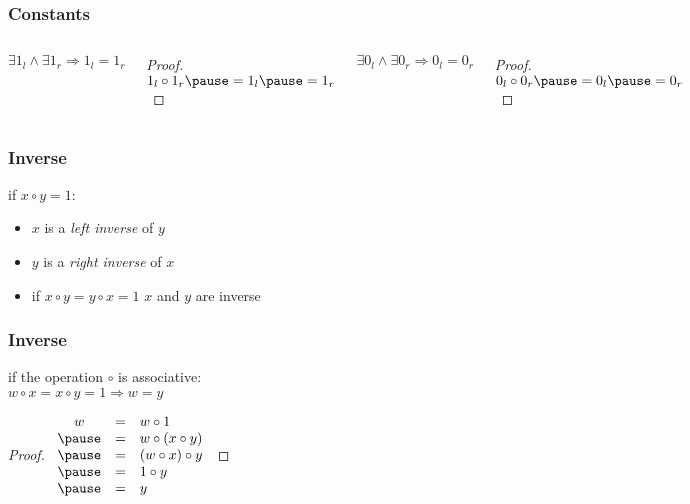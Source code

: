 \documentclass[dvipsnames]{beamer}
\begin{document}
\begin{frame}
  \frametitle{Constants}

  \begin{columns}
    \begin{theorem}
      $\exists 1_l \wedge \exists 1_r \Rightarrow 1_l = 1_r$
    \end{theorem}

    \pause
    \begin{proof}
      $1_l \circ 1_r \pause = 1_l \pause = 1_r$
    \end{proof}

    \pause
    \begin{theorem}
      $\exists 0_l \wedge \exists 0_r \Rightarrow 0_l = 0_r$
    \end{theorem}

    \pause
    \begin{proof}
      $0_l \circ 0_r \pause = 0_l \pause = 0_r$
    \end{proof}
  \end{columns}
\end{frame}

\begin{frame}
  \frametitle{Inverse}

  \begin{definition}
    if $x \circ y = 1$:

    \begin{itemize}
      \item $x$ is a \emph{left inverse} of $y$
      \item $y$ is a \emph{right inverse} of $x$

      \pause
      \medskip
      \item if $x \circ y = y \circ x = 1$
        $x$ and $y$ are \alert{inverse}
    \end{itemize}
  \end{definition}
\end{frame}

\begin{frame}
  \frametitle{Inverse}

  \begin{theorem}
    if the operation $\circ$ is associative:\\
    $w \circ x = x \circ y = 1 \Rightarrow w = y$
  \end{theorem}

  \pause
  \begin{proof}
    $\begin{array}{ccl}
      w & = & w \circ 1\\ \pause
        & = & w \circ (x \circ y)\\ \pause
        & = & (w \circ x) \circ y\\ \pause
        & = & 1 \circ y\\ \pause
        & = & y
    \end{array}$
  \end{proof}
\end{frame}
\end{document}
